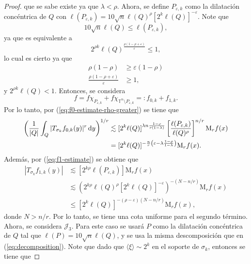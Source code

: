 \begin{proof}
que se sabe existe ya que $\lambda < \rho$. Ahora, se define $P_{\varepsilon, k}$ como la dilatación concéntrica de $Q$  con $\ell(P_{\varepsilon, k}) = 10 \sqrt{n}\ell(Q)^\rho [2^k\ell(Q)]^{-\varepsilon} $. Note que 
\begin{equation*}
	10\sqrt{n} \ell(Q) \leq \ell(P_{\varepsilon, k}),
\end{equation*}
ya que es equivalente a 
\begin{equation*}
	2^{\rho k} \ell(Q)^{\frac{\rho(1-\rho + \varepsilon)}{\varepsilon} } \leq 1, 
\end{equation*}
lo cual es cierto ya que 
\begin{align*}
	\rho(1-\rho) & \geq \varepsilon(1-\rho) \\
	\frac{\rho(1-\rho + \varepsilon)}{\varepsilon} & \geq 1,
\end{align*}
y $2^{\rho k}\ell(Q) < 1$. Entonces, se considera 
\begin{equation*}
	f = f\chi_{P_{\varepsilon, k}} + f\chi_{ \mathbb{T}^n\setminus P_{\varepsilon, k}} =: f_{0,k} + f_{1,k}.
\end{equation*}
Por lo tanto, por (\ref{eq:f0-estimate-rho-greater}) se tiene que 
\begin{align*}
	\left( \frac{1}{|Q|}\int_Q |T_{\sigma_k} f_{0, k}(y)|^r \mathop{}\!\mathrm{d} y 
	\right)^{1/r} & \lesssim [2^k\ell(Q)]^{\lambda n \frac{1-\rho}{r(1-\lambda)}} \left[ \frac{\ell(P_{\varepsilon, k}) }{\ell(Q)^\rho} \right]^{n/r} \mathrm{M}_rf(x)\\
	& =  [2^k\ell(Q)]^{-\frac{n}{r}\left(\varepsilon - \lambda \frac{1-\rho}{1-\lambda}\right)} \mathrm{M}_rf(x).
\end{align*}
Además, por (\ref{eq:f1-estimate}) se obtiene que
\begin{align*}
	|T_{\sigma_k}f_{1, k}(y)| & \lesssim [2^{k\rho}\ell(P_{\varepsilon,k})]\mathrm{M}_rf(x)\\
	& \lesssim\left( 2^{k\rho}\ell(Q)^\rho [2^k\ell(Q)]^{-\varepsilon} 
	\right)^{-(N-n/r)} \mathrm{M}_rf(x) \\
	& \leq [2^k\ell(Q)]^{-(\rho-\varepsilon)(N-n/r)}\mathrm{M}_rf(x),        
\end{align*}
donde $N>n/r$. Por lo tanto, se tiene una cota uniforme para el segundo término. Ahora, se considera $\mathcal{J}_3$. Para este caso se usará $P$ como la dilatación concéntrica de $Q$ tal que $\ell(P)=10\sqrt{n}\ell(Q)$, y se usa la misma descomposición que en (\ref{eq:decomposition}). Note que dado que $\langle\xi\rangle \sim 2^k$ en el soporte de $\sigma_k$, entonces se tiene que

\end{proof}
